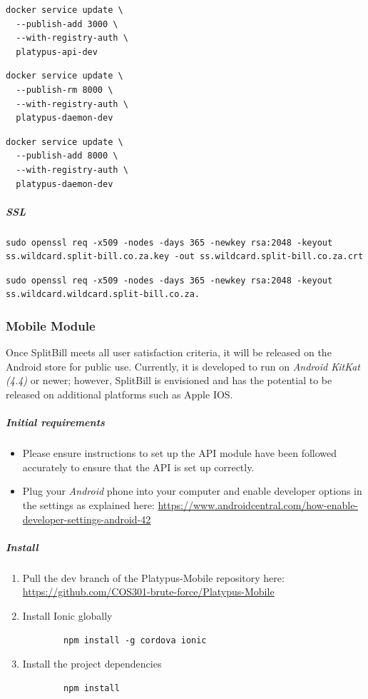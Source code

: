 \documentclass[12pt,a4paper]{article}
\begin{document}
\begin{lstlisting}
docker service update \
  --publish-add 3000 \
  --with-registry-auth \
  platypus-api-dev
\end{lstlisting}

\begin{lstlisting}
docker service update \
  --publish-rm 8000 \
  --with-registry-auth \
  platypus-daemon-dev
\end{lstlisting}

\begin{lstlisting}
docker service update \
  --publish-add 8000 \
  --with-registry-auth \
  platypus-daemon-dev
\end{lstlisting}


\subparagraph{SSL}
\subparagraph{}

\begin{lstlisting}
sudo openssl req -x509 -nodes -days 365 -newkey rsa:2048 -keyout ss.wildcard.split-bill.co.za.key -out ss.wildcard.split-bill.co.za.crt
\end{lstlisting}

\begin{lstlisting}
sudo openssl req -x509 -nodes -days 365 -newkey rsa:2048 -keyout ss.wildcard.wildcard.split-bill.co.za.
\end{lstlisting}

    \subsubsection{Mobile Module}
    Once SplitBill meets all user satisfaction criteria, it will be released on the Android store for public use. Currently, it is developed to run on \emph{Android KitKat (4.4)} or newer; however, SplitBill is envisioned and has the potential to be released on additional platforms such as Apple IOS. 
    
   \subparagraph{Initial requirements}
\begin{itemize}
\item Please ensure instructions to set up the API module have been followed accurately to ensure that the API is set up correctly.
\item Plug your \emph{Android} phone into your computer and enable developer options in the settings as explained here: 
\url {https://www.androidcentral.com/how-enable-developer-settings-android-42}
\end{itemize}



\subparagraph{Install}
\begin{enumerate}
\item Pull the dev branch of the Platypus-Mobile repository here: \url{ https://github.com/COS301-brute-force/Platypus-Mobile}
\item Install Ionic globally
	\begin{lstlisting}
		npm install -g cordova ionic
	\end{lstlisting}
\item Install the project dependencies
\begin{lstlisting}
		npm install
	\end{lstlisting}
\end{enumerate}
\end{document}
